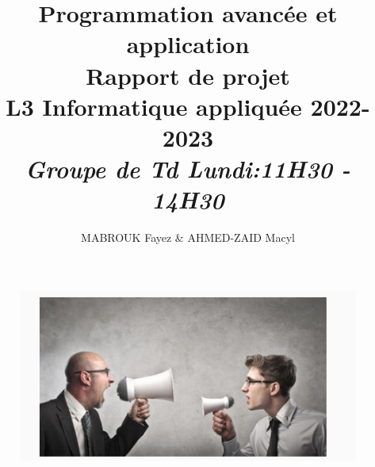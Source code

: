 \documentclass[12pt]{article}
\date{}
\author{MABROUK Fayez \& AHMED-ZAID Macyl}
\title{{\bf  Programmation avancée et application} \\
	Rapport de projet  \\
	{\small L3 Informatique appliquée 2022-2023} \\
	{\it \small  Groupe de Td Lundi:11H30 - 14H30}}
\begin{document}
	\maketitle
		\begin{figure}[!hbtp]
		\centering
		\includegraphics[scale=2]{Capture.PNG}
	\end{figure}
	\newpage
\end{document}

